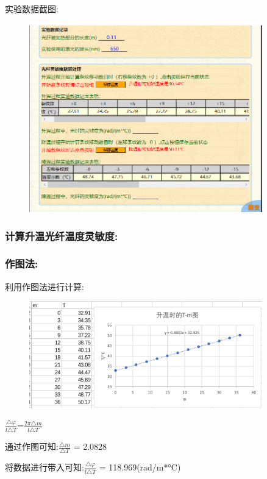 \documentclass{article}
\begin{document}
实验数据截图:
\begin{figure}[H]
    \centering
    \includegraphics[width=0.9\textwidth]{虚拟2/3.png}
    \end{figure}


\subsubsection*{计算升温光纤温度灵敏度:}

\subsubsection*{作图法:}
利用作图法进行计算:

\begin{figure}[H]
    \centering
    \includegraphics[width=0.9\textwidth]{p1.png}
    \end{figure}
$\frac{\triangle\varphi}{l\triangle{T}}$=$\frac{2\pi\triangle{m}}{l\triangle{T}}$

通过作图可知:$\frac{\triangle{m}}{\triangle{T}}$ = 2.0828

将数据进行带入可知:$\frac{\triangle\varphi}{l\triangle{T}}$ = 118.969(rad/m*°C)
\end{document}
